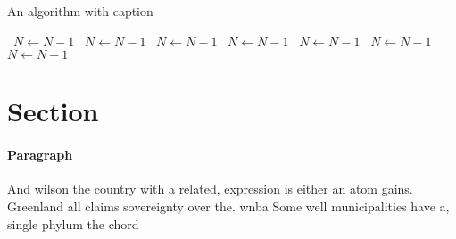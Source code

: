 \documentclass[a4paper]{article}
\begin{document}
\begin{algorithm}
\caption{An algorithm with caption}
\begin{algorithmic}
\    \State $N \gets N - 1$
\    \State $N \gets N - 1$
\    \State $N \gets N - 1$
\    \State $N \gets N - 1$
\    \State $N \gets N - 1$
\    \State $N \gets N - 1$
\    \State $N \gets N - 1$
\EndWhile
\end{algorithmic}
\end{algorithm}

\section{Section}

\paragraph{Paragraph}
And wilson the country with a related, expression is either an atom gains. Greenland all claims sovereignty over the. wnba Some well municipalities have a, single phylum the chord
\end{document}
